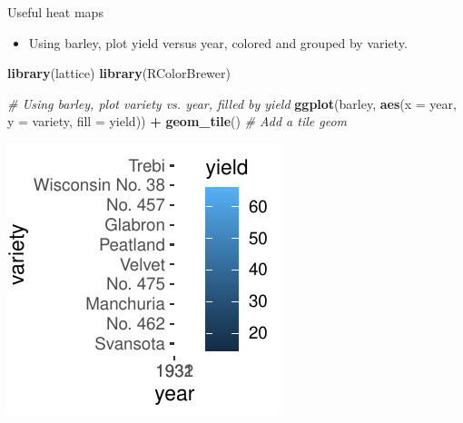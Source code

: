 \documentclass[
  ignorenonframetext,
]{beamer}
\newenvironment{Shaded}{\begin{snugshade}}{\end{snugshade}}
\newcommand{\AttributeTok}[1]{\textcolor[rgb]{0.13,0.29,0.53}{#1}}
\newcommand{\CommentTok}[1]{\textcolor[rgb]{0.56,0.35,0.01}{\textit{#1}}}
\newcommand{\FunctionTok}[1]{\textcolor[rgb]{0.13,0.29,0.53}{\textbf{#1}}}
\newcommand{\NormalTok}[1]{#1}
\newcommand{\SpecialCharTok}[1]{\textcolor[rgb]{0.81,0.36,0.00}{\textbf{#1}}}
\providecommand{\tightlist}{%
  \setlength{\itemsep}{0pt}\setlength{\parskip}{0pt}}
\begin{document}
\begin{frame}[fragile]{Useful heat maps}
\label{useful-heat-maps-4}
\begin{itemize}
\tightlist
\item
  Using barley, plot yield versus year, colored and grouped by variety.
\end{itemize}


\begin{Shaded}
\begin{Highlighting}[]
\FunctionTok{library}\NormalTok{(lattice)}
\FunctionTok{library}\NormalTok{(RColorBrewer)}

\CommentTok{\# Using barley, plot variety vs. year, filled by yield}
\FunctionTok{ggplot}\NormalTok{(barley, }\FunctionTok{aes}\NormalTok{(}\AttributeTok{x =}\NormalTok{ year, }\AttributeTok{y =}\NormalTok{ variety, }\AttributeTok{fill =}\NormalTok{ yield)) }\SpecialCharTok{+} \FunctionTok{geom\_tile}\NormalTok{()  }\CommentTok{\# Add a tile geom}
\end{Highlighting}
\end{Shaded}

\begin{center}\includegraphics[width=0.5\linewidth]{Figs/unnamed-chunk-116-1} \end{center}
\end{frame}
\end{document}
